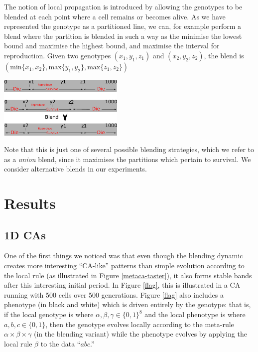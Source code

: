 \documentclass{AISB2008}
\makeatletter
\renewcommand{\boxed}[1]{\text{\fboxsep=.2em\fbox{\m@th$\displaystyle#1$}}}
\newcommand{\mystrut}{\vphantom{b\gamma}}
\makeatother
\begin{document}
The notion of local propagation is introduced by allowing the
genotypes to be blended at each point where a cell remains or becomes
alive.  As we have represented the genotype as a partitioned line, we
can, for example perform a blend where the partition is blended in
such a way as the minimise the lowest bound and maximise the highest
bound, and maximise the interval for reproduction.  Given two
genotypes $(x_1, y_1, z_1)$ and $(x_2, y_2, z_2)$, the blend is
$(\mathrm{min} \{x_1,x_2\}, \mathrm{max} \{y_1,y_2\}, \mathrm{max}
\{z_1,z_2\})$
\begin{center}
\includegraphics[width=0.45\textwidth]{2dgenotypeblend.pdf}
\end{center}

Note that this is just one of several possible blending strategies,
which we refer to as a {\em union} blend, since it maximises the
partitions which pertain to survival.  We consider alternative blends
in our experiments.



\section{Results}
\subsection{1D CAs} \label{1d-results}

One of the first things we noticed was that even though the blending
dynamic creates more interesting ``CA-like'' patterns than simple
evolution according to the local rule (as illustrated in Figure
\ref{metaca-taster}), it also forms stable bands after this
interesting initial period.  In Figure \ref{flag}, this is illustrated
in a CA running with 500 cells over 500 generations.  Figure
\ref{flag} also includes a phenotype (in black and white) which is
driven entirely by the genotype: that is, if the local genotype is
\boxed{\alpha\mystrut}\boxed{\beta\mystrut}\boxed{\gamma\mystrut} 
where $\alpha, \beta, \gamma \in \{0,1\}^8$
and the local phenotype is
%
\boxed{a\mystrut}\boxed{b\mystrut}\boxed{c\mystrut}
where $a, b, c \in \{0,1\}$,
%
then the genotype evolves locally according to the meta-rule $\alpha
\times \beta \times \gamma$ (in the blending variant) while the
phenotype evolves by applying the local rule $\beta$ to the data
``$abc$.''
\end{document}
